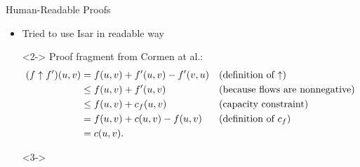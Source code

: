 \documentclass[fleqn]{beamer}
\begin{document}
\begin{frame}{Human-Readable Proofs}
  \begin{itemize}
   \item<1-> Tried to use Isar in readable way
  
    \begin{uncoverenv}<2->
    {\footnotesize Proof fragment from Cormen at al.:
    \begin{align*}
    (f \uparrow f') (u, v) &= f(u, v) + f'(u, v) - f'(v, u)  && \text{(definition of ${\mathbin\uparrow}$)} \\
    & \leq f(u, v) + f'(u, v) && \text{(because flows are nonnegative)} \\
    & \leq f(u, v) + c_f(u, v) &&  \text{(capacity constraint)} \\
    & = f(u, v) + c(u, v) - f(u, v) && \text{(definition of $c_f$)} \\
    & = c (u, v).
    \end{align*}
    }
    \end{uncoverenv}

    \begin{uncoverenv}<3->
    \end{uncoverenv}

  \end{itemize}
\end{frame}
\end{document}
